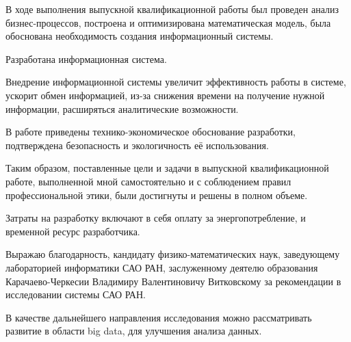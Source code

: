 В ходе выполнения выпускной квалификационной работы был проведен анализ бизнес-процессов, построена и оптимизирована математическая модель, была обоснована необходимость создания информационный системы.

Разработана информационная система.

Внедрение информационной системы увеличит эффективность работы в системе, ускорит обмен информацией, из-за снижения времени на получение нужной информации, расширяться аналитические возможности.

В работе приведены технико-экономическое обоснование разработки, подтверждена безопасность и экологичность её использования.

Таким образом, поставленные цели и задачи в выпускной квалификационной работе, выполненной мной самостоятельно и с соблюдением правил профессиональной этики, были достигнуты и решены в полном объеме.

Затраты на разработку включают в себя оплату за энергопотребление, и временной ресурс разработчика.   

Выражаю благодарность, кандидату физико-математических наук, заведующему лабораторией информатики САО РАН, заслуженному деятелю образования Карачаево-Черкесии Владимиру Валентиновичу Витковскому за рекомендации в исследовании системы САО РАН.   

В качестве дальнейшего направления исследования можно рассматривать развитие в области big data, для улучшения анализа данных. 

\pagebreak